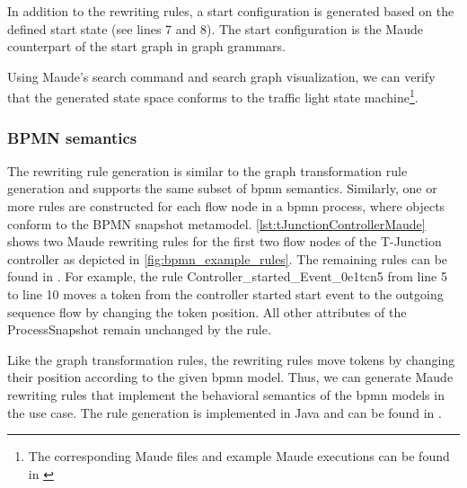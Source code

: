 \documentclass{jot}
\begin{document}
In addition to the rewriting rules, a start configuration is generated based on the defined start state (see lines 7 and 8).
The start configuration is the Maude counterpart of the start graph in graph grammars.



Using Maude's search command and search graph visualization, we can verify that the generated state space conforms to the traffic light state machine\footnote{\label{footnote:maudeArtifacts}The corresponding Maude files and example Maude executions can be found in \cite{krauterArtifactsBehavioralConsistency2022}}.

\subsubsection{BPMN semantics}
The rewriting rule generation is similar to the graph transformation rule generation and supports the same subset of \gls*{bpmn} semantics.
Similarly, one or more rules are constructed for each flow node in a \gls*{bpmn} process, where objects conform to the BPMN snapshot metamodel.
\autoref{lst:tJunctionControllerMaude} shows two Maude rewriting rules for the first two flow nodes of the T-Junction controller as depicted in \autoref{fig:bpmn_example_rules}.
The remaining rules can be found in \cite{krauterArtifactsBehavioralConsistency2022}.
For example, the rule \textsf{Controller\_started\_Event\_0e1tcn5} from line 5 to line 10 moves a token from the controller started start event to the outgoing sequence flow by changing the token position.
All other attributes of the \textsf{ProcessSnapshot} remain unchanged by the rule.





Like the graph transformation rules, the rewriting rules move tokens by changing their position according to the given \gls*{bpmn} model.
Thus, we can generate Maude rewriting rules that implement the behavioral semantics of the \gls*{bpmn} models in the use case.
The rule generation is implemented in Java and can be found in \cite{krauterRewriteRuleGeneration2022}.
\end{document}

